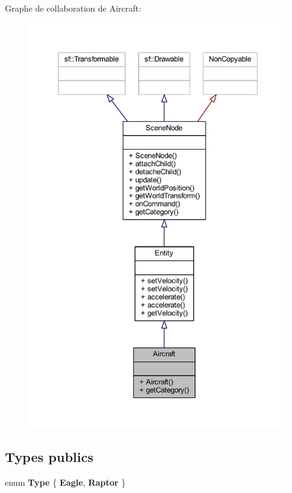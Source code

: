 Graphe de collaboration de Aircraft\+:\nopagebreak
\begin{figure}[H]
\begin{center}
\leavevmode
\includegraphics[width=350pt]{class_aircraft__coll__graph}
\end{center}
\end{figure}
\subsection*{Types publics}
\begin{DoxyCompactItemize}
\item 
enum {\bfseries Type} \{ {\bfseries Eagle}, 
{\bfseries Raptor}
 \}\hypertarget{class_aircraft_a7dae28542933e088032b753600046acd}{}\label{class_aircraft_a7dae28542933e088032b753600046acd}

\end{DoxyCompactItemize}
